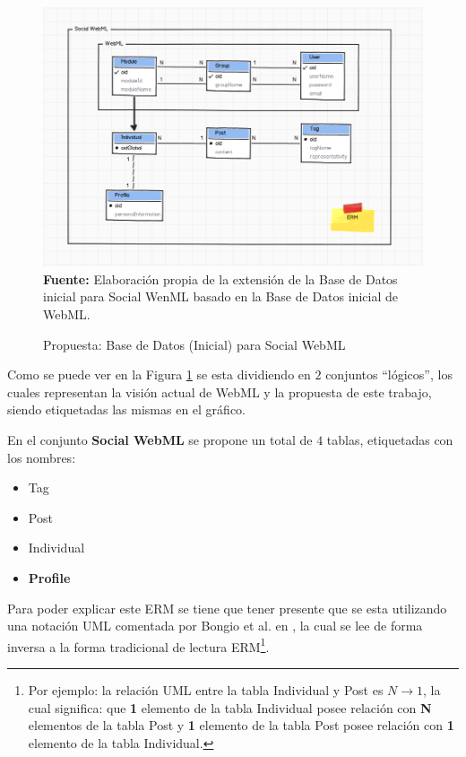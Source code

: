 \documentclass[oneside,12pt,a4paper]{memoir}%
\begin{document}
		\begin{figure}[here]
			\centering
			\caption{Propuesta: Base de Datos (Inicial) para Social WebML}
			\includegraphics[angle=90,width=1.0\textwidth]{figure/fig_proposalBD.png}
			\newline
			\textbf{Fuente:} Elaboraci\'on propia de la extensi\'on de la Base de
			Datos inicial para Social WenML basado en la Base de Datos inicial de
			\ac{WebML}.
			\label{fig:proposalDB}
		\end{figure}
			  
		Como se puede ver en la Figura \ref{fig:proposalDB} se esta dividiendo en $2$
		conjuntos ``l\'ogicos'', los cuales representan la visi\'on actual de
		\ac{WebML} y la propuesta de este trabajo, siendo etiquetadas las mismas en el
		gr\'afico.
		
		En el conjunto \textbf{Social WebML} se propone un total de $4$ tablas,
		etiquetadas con los nombres:
		
		\begin{itemize}
		  \item Tag
		  \item Post
		  \item Individual 
		  \item \textbf{Profile}
		\end{itemize}
		
		Para poder explicar este \ac{ERM} se tiene que tener presente que se esta
		utilizando una notaci\'on \ac{UML} comentada por Bongio et al. en
		\cite{Ceri2003}, la cual se lee de forma inversa a la forma tradicional de
		lectura \ac{ERM}\footnote{Por ejemplo: la relaci\'on \ac{UML} entre la tabla
		Individual y Post es $N \to 1$, la cual significa: que \textbf{1} elemento de
		la tabla Individual posee relaci\'on con \textbf{N} elementos de la tabla Post
		y \textbf{1} elemento de la tabla Post posee relaci\'on con \textbf{1} elemento
		de la tabla Individual.}.
		
\end{document}
